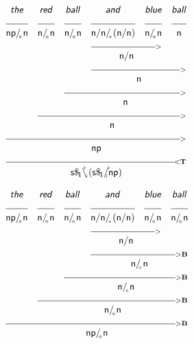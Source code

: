 \documentclass{article}
\newcommand{\deriv}[2]
{  \renewcommand{\arraystretch}{.5}
$\begin{array}[t]{*{#1}{c}}
     #2
   \end{array}$ }
\newcommand{\gf}[1]{\textsf{\textsl{#1}}}
\newcommand{\cf}[1]{\mbox{\ensuremath{\cfont{#1}}}}
\newcommand{\uline}[1]
{\mc{#1}{\hrulefill} }
\newcommand{\mc}[2]
  {\multicolumn{#1}{c}{#2}}
\newcommand{\cfont}{\mathsf}
\newcommand{\bs}{\backslash}
\newcommand{\subsa}[1]{\hspace{-0.75mm}_{_{#1}}}
\newcommand{\subsb}[1]{\hspace{-0.10mm}_{_{#1}}}
\newcommand{\subs}[1]{\hspace{-0.40mm}_{#1}}
\newcommand{\supsa}[1]{\hspace{-1.75mm}^{^{#1}} }
\newcommand{\supsb}[1]{\hspace{-0.80mm}^{^{#1}}  }
\begin{document}
\vspace{5mm}

\deriv{6}{
\gf{the} & \gf{red} & \gf{ball} & \gf{and} & \gf{blue} & \gf{ball} \\
\uline{1} & \uline{1} & \uline{1} & \uline{1} & \uline{1} & \uline{1} \\
\cf{np/ \subsa{\diamond} n} & \cf{n/ \subsa{\diamond} n} & \cf{n/ \subsa{\diamond} n} & \cf{n/ n/ \subsa{*} (n/ n)} & \cf{n/ \subsa{\diamond} n} & \cf{n} \\
&&& \mc{2} {\hrulefill_{>}} \\
&&& \mc{2}{\cf{n/ n}} \\
&&& \mc{3} {\hrulefill_{>}} \\
&&& \mc{3}{\cf{n}} \\
&& \mc{4} {\hrulefill_{>}} \\
&& \mc{4}{\cf{n}} \\
& \mc{5} {\hrulefill_{>}} \\
& \mc{5}{\cf{n}} \\
 \mc{6} {\hrulefill_{>}} \\
 \mc{6}{\cf{np}} \\
 \mc{6} {\hrulefill_{<\mathbf{T}}}\\
 \mc{6}{\cf{s\$ \subs{1}\bs \supsa{+} \hspace{-0.50mm} \subsb{i} (s\$ \subs{1}/ \supsb{+} \hspace{-1.45mm} \subsa{i} np)}} \\
}

\vspace{5mm}

\deriv{6}{
\gf{the} & \gf{red} & \gf{ball} & \gf{and} & \gf{blue} & \gf{ball} \\
\uline{1} & \uline{1} & \uline{1} & \uline{1} & \uline{1} & \uline{1} \\
\cf{np/ \subsa{\diamond} n} & \cf{n/ \subsa{\diamond} n} & \cf{n/ \subsa{\diamond} n} & \cf{n/ n/ \subsa{*} (n/ n)} & \cf{n/ \subsa{\diamond} n} & \cf{n/ \subsa{\diamond} n} \\
&&& \mc{2} {\hrulefill_{>}} \\
&&& \mc{2}{\cf{n/ n}} \\
&&& \mc{3} {\hrulefill_{>\mathbf{B}}}\\
&&& \mc{3}{\cf{n/ \subsa{\diamond} n}} \\
&& \mc{4} {\hrulefill_{>\mathbf{B}}}\\
&& \mc{4}{\cf{n/ \subsa{\diamond} n}} \\
& \mc{5} {\hrulefill_{>\mathbf{B}}}\\
& \mc{5}{\cf{n/ \subsa{\diamond} n}} \\
 \mc{6} {\hrulefill_{>\mathbf{B}}}\\
 \mc{6}{\cf{np/ \subsa{\diamond} n}} \\
}

\vspace{5mm}
\end{document}
